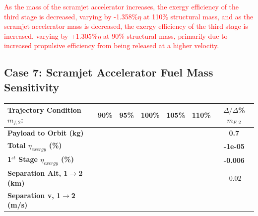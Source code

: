 \textcolor{red}{
As the mass of the scramjet accelerator increases, the exergy efficiency of the third stage is decreased, varying by -1.358\%$\eta$ at 110\% structural mass, and as the scramjet accelerator mass is decreased, the exergy efficiency of the third stage is increased, varying by +1.305\%$\eta$ at 90\% structural mass, primarily due to increased propulsive efficiency from being released at a higher velocity. }


\subsection{Case 7: Scramjet Accelerator Fuel Mass Sensitivity} \label{sec:fuelmassNoReturn}

\begin{table}[!ht] %
\begin{tabular}{l c c c c c c} 
	\hline \textbf{Trajectory Condition}   \qquad  $m_{f,2}$:
	&90\%
	&95\%
	&100\%
	&105\%
	&110\%
	& $\Delta/\Delta$\%$m_{F,2}$
	\\
	\hline \textbf{Payload to Orbit (kg)}
	& \textbf{\PayloadToOrbitmFuelNinetyNoReturn}
	& \textbf{\PayloadToOrbitmFuelNinetyFiveNoReturn}
	& \textbf{\PayloadToOrbitmFuelStandardNoReturn}
	& \textbf{\PayloadToOrbitmFuelOneHundredFiveNoReturn}
	& \textbf{\PayloadToOrbitmFuelOneHundredTenNoReturn}
	&\textbf{0.7}
	\\
	\textbf{Total $\eta_{exergy}$ (\%)}
	& \textbf{\totalExergyEffmFuelNinetyNoReturn}
	& \textbf{\totalExergyEffmFuelNinetyFiveNoReturn}
	& \textbf{\totalExergyEffmFuelStandardNoReturn}
	& \textbf{\totalExergyEffmFuelOneHundredFiveNoReturn}
	& \textbf{\totalExergyEffmFuelOneHundredTenNoReturn}
	& \textbf{-1e-05}
	\\
	\hline 
	\textbf{1$^{st}$ Stage $\eta_{exergy}$ (\%)}
	& \textbf{\firstExergyEffmFuelNinetyNoReturn}
	& \textbf{\firstExergyEffmFuelNinetyFiveNoReturn}
	& \textbf{\firstExergyEffmFuelStandardNoReturn}
	& \textbf{\firstExergyEffmFuelOneHundredFiveNoReturn}
	& \textbf{\firstExergyEffmFuelOneHundredTenNoReturn}
	& \textbf{-0.006}
	\\
	\textbf{Separation Alt, 1$\rightarrow$2 (km)}
	& \firstsecondSeparationAltmFuelNinetyNoReturn
	& \firstsecondSeparationAltmFuelNinetyFiveNoReturn
	& \firstsecondSeparationAltmFuelStandardNoReturn
	& \firstsecondSeparationAltmFuelOneHundredFiveNoReturn
	& \firstsecondSeparationAltmFuelOneHundredTenNoReturn
	&-0.02
	\\
	\textbf{Separation v, 1$\rightarrow$2 (m/s)}
	& \firstsecondSeparationvmFuelNinetyNoReturn

\end{tabular}
\end{table}

